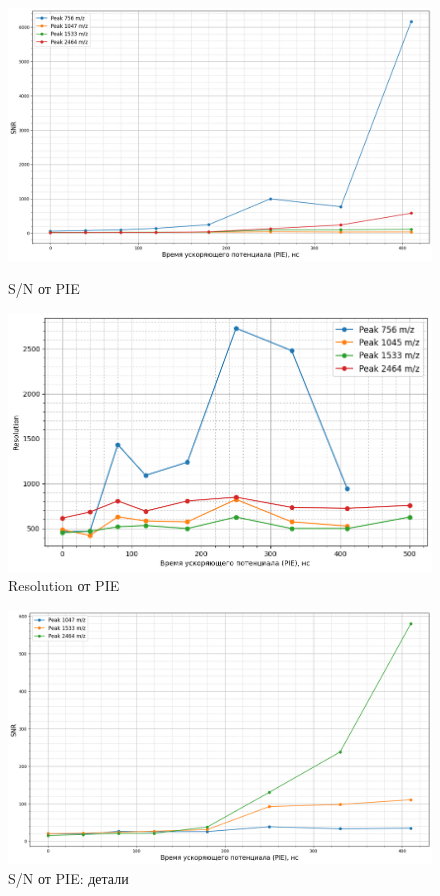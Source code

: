 \documentclass{article}
\begin{document}
\begin{figure}[h!] 
        \centering
        \centering
            \includegraphics[width=0.9\linewidth]{Images/SN(PIE).png}
                 \caption{S/N от PIE}
                 \label{SNR - PIE}
        \endminipage\hfill
        \centering
             \includegraphics[width=0.9\linewidth]{Images/Res(PIE).png}
                 \caption{Resolution от PIE}
                 \label{Re - PIE}
        \endminipage
        
\end{figure}

\begin{figure}[h!]
\centering
    \includegraphics[width=0.6\linewidth]{Images/SNR(PIE) details.png}
    \caption{S/N от PIE: детали}
    \label{Детали 3}
\end{figure}
\end{document}
